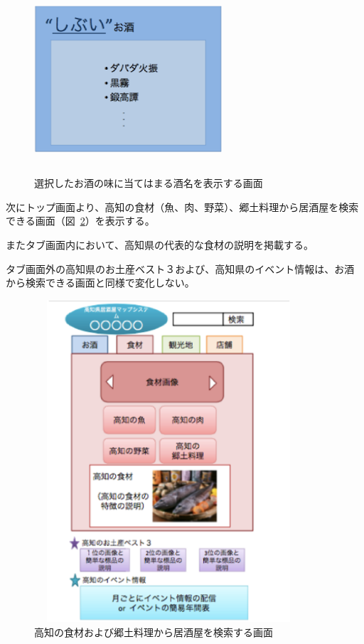\begin {figure}[!htbp]
    \begin{center}
    \includegraphics [height=7cm, width=7cm]{7.eps}
    \caption {選択したお酒の味に当てはまる酒名を表示する画面}
    \label {fig:7}
    \end{center}
\end {figure}



次にトップ画面より、高知の食材（魚、肉、野菜）、郷土料理から居酒屋を検索できる画面（図~\ref{fig:8}）を表示する。



またタブ画面内において、高知県の代表的な食材の説明を掲載する。



タブ画面外の高知県のお土産ベスト３および、高知県のイベント情報は、お酒から検索できる画面と同様で変化しない。
\clearpage
\begin {figure}[!htbp]
    \begin{center}
    \includegraphics [height=12cm, width=10cm]{8.eps}
    \caption {高知の食材および郷土料理から居酒屋を検索する画面}
    \label {fig:8}
    \end{center}
\end {figure}



